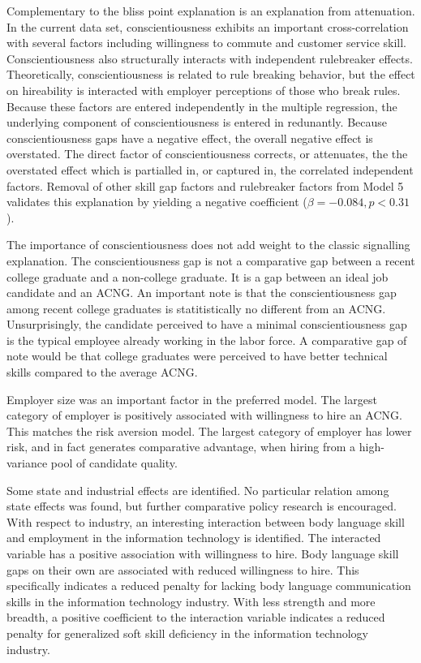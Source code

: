 \documentclass[review]{elsarticle}
\begin{document}
Complementary to the bliss point explanation is an explanation from attenuation.
In the current data set, conscientiousness exhibits an important cross-correlation with several factors including willingness to commute and customer service skill.
Conscientiousness also structurally interacts with independent rulebreaker effects.
Theoretically, conscientiousness is related to rule breaking behavior, but the effect on hireability is interacted with employer perceptions of those who break rules.
Because these factors are entered independently in the multiple regression, the underlying component of conscientiousness is entered in redunantly.
Because conscientiousness gaps have a negative effect, the overall negative effect is overstated.
The direct factor of conscientiousness corrects, or attenuates, the the overstated effect which is partialled in, or captured in, the correlated independent factors.
Removal of other skill gap factors and rulebreaker factors from Model 5 validates this explanation by yielding a negative coefficient ($\beta = -0.084, p < 0.31$).

The importance of conscientiousness does not add weight to the classic signalling explanation.
The conscientiousness gap is not a comparative gap between a recent college graduate and a non-college graduate.
It is a gap between an ideal job candidate and an ACNG.
An important note is that the conscientiousness gap among recent college graduates is statitistically no different from an ACNG.
Unsurprisingly, the candidate perceived to have a minimal conscientiousness gap is the typical employee already working in the labor force.
A comparative gap of note would be that college graduates were perceived to have better technical skills compared to the average ACNG.

Employer size was an important factor in the preferred model.
The largest category of employer is positively associated with willingness to hire an ACNG.
This matches the risk aversion model.
The largest category of employer has lower risk, and in fact generates comparative advantage, when hiring from a high-variance pool of candidate quality.

Some state and industrial effects are identified.
No particular relation among state effects was found, but further comparative policy research is encouraged.
With respect to industry, an interesting interaction between body language skill and employment in the information technology is identified.
The interacted variable has a positive association with willingness to hire.
Body language skill gaps on their own are associated with reduced willingness to hire.
This specifically indicates a reduced penalty for lacking body language communication skills in the information technology industry.
With less strength and more breadth, a positive coefficient to the interaction variable indicates a reduced penalty for generalized soft skill deficiency in the information technology industry.
\end{document}
